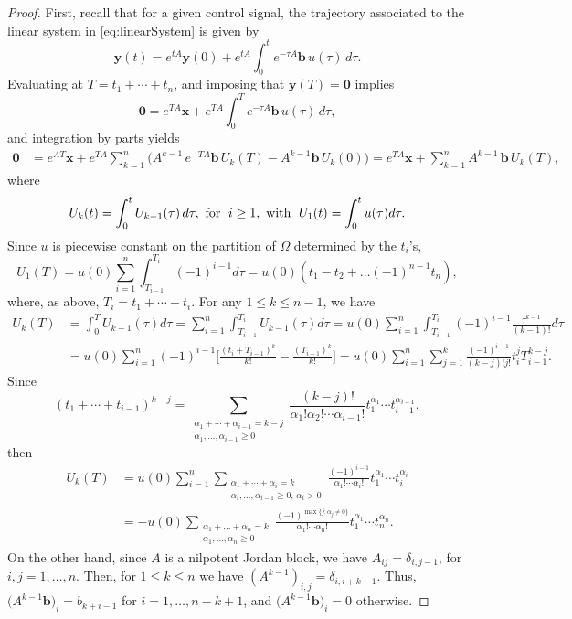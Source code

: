 \documentclass[10pt,a4paper]{amsart}
\begin{document}
 \begin{proof}
 First, recall that for a given control signal, the trajectory associated to the linear system in \eqref{eq:linearSystem} is given by 
 \begin{equation*}
 \bm{y}(t)=e^{tA}\bm{y}(0)+e^{tA}\int_{0}^{t}e^{-\tau A}\bm{b}\,u(\tau)\,d\tau. 
 \end{equation*} 
Evaluating at $T=t_1+\cdots+t_n$, and imposing that $\bm{y}(T)=\bm{0}$ implies
 \[\bm{0}=e^{TA}\bm{x}+e^{TA}\int_{0}^{T}e^{-\tau A}\bm{b}\,u(\tau)\, d\tau,
 \]
 and integration by parts yields
 \begin{align}
 \bm{0}&=e^{AT}\bm{x}+e^{TA}\sum_{k=1}^{n} \bigl(A^{k-1}\, e^{-T A}\bm b\, U_k(T)-A^{k-1}\bm b\,U_k(0)\bigr)=e^{TA}\bm{x}+\sum_{k=1}^{n} A^{k-1}\,\bm{b}\,U_k(T),\label{eq:eq}
 \end{align}
 where 
 \[U_{k}(t)=\int_0^t U_{k-1}(\tau)\, d\tau, \text{ for\; } i\geq 1, \text{ with\; } U_1(t)=\int_{0}^t u(\tau) d\tau.
 \]
 Since $u$ is piecewise constant on the partition of $\Omega$ determined by the $t_i$'s, 
 \[U_1(T)=u(0)\sum_{i=1}^{n}\int_{T_{i-1}}^{T_i} (-1)^{i-1}d\tau=u(0)(t_1-t_2+\dots(-1)^{n-1}t_n),\] 
 where, as above, $T_i=t_1+\cdots+t_i$. 
 For any $1\leq k\leq n-1$, we have
 \begin{align*} 
 U_{k}(T)&=\int_{0}^{T}U_{k-1}(\tau)d\tau=\sum_{i=1}^{n}\int_{T_{i-1}}^{T_i}U_{k-1}(\tau)d\tau
 =
 u(0)\sum_{i=1}^n\int_{T_{i-1}}^{T_i} (-1)^{i-1}\frac{\tau^{k-1}}{(k-1)!}d\tau
 \\
 &= u(0)\sum_{i=1}^n (-1)^{i-1}\biggl[\frac{(t_i+T_{i-1})^k}{k!}-\frac{(T_{i-1})^k}{k!}\biggr]= u(0)\sum_{i=1}^n\sum_{j=1}^k\frac{(-1)^{i-1}}{(k-j)!j!}t_i^jT_{i-1}^{k-j}.\nonumber
 \end{align*}
 Since
 \[\left(t_1+\cdots+t_{i-1}\right)^{k-j}
 =
 \sum_{\substack{\alpha_1+\cdots+\alpha_{i-1}=k-j\\ \alpha_{1},\dots,\alpha_{i-1}\geq 0}}\frac{(k-j)!}{\alpha_{1}! \alpha_{2}!\cdots \alpha_{i-1}!}t_1^{\alpha_1} \cdots t_{i-1}^{\alpha_{i-1}},
 \]
 then
 \begin{align}
 U_{k}(T)&=
 u(0)\sum_{i=1}^n\sum_{\substack{\alpha_1+\cdots+\alpha_{i}=k\\\alpha_i,\dots,\alpha_{i-1}\geq 0,\,\alpha_i>0}}\frac{(-1)^{i-1}}{\alpha_{1}!\cdots \alpha_{i}!}t_1^{\alpha_1} \cdots t_{i}^{\alpha_{i}}\nonumber\\
 &=
 -u(0)\sum_{\substack{\alpha_1+\dots+\alpha_n=k\\\alpha_1,\ldots,\alpha_n\geq0}}\frac{(-1)^{\max\{j\colon \alpha_j\neq 0\}}}{\alpha_{1}! \cdots \alpha_{n}!}t_1^{\alpha_1}\cdots t_n^{\alpha_n}.\label{eq:sum}
 \end{align}
 On the other hand, since $A$ is a nilpotent Jordan block, we have $A_{ij}=\delta_{i,j-1}$, for $i,j=1, \dots, n$.
 Then, for $1\leq k\leq n$ we have $(A^{k-1})_{i,j}=\delta_{i,i+k-1}$. Thus, $\bigl( A^{k-1}\bm{b}\bigr)_{i}=b_{k+i-1}$ for $i=1,\dots, n-k+1$, and $\bigl( A^{k-1}\bm{b}\bigr)_{i}=0$ otherwise.
 

\end{proof}
\end{document}
